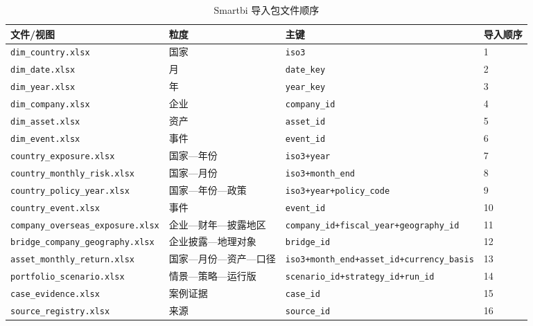 \documentclass[UTF8,fontset=windows,12pt,openany]{ctexbook}
\newcommand{\Field}[1]{{\small\nolinkurl{#1}}}
\begin{document}
\begin{longtable}{p{4.2cm}p{3.3cm}p{3.2cm}p{2.6cm}}
\caption{Smartbi 导入包文件顺序}\label{tab:import-package}\\
\toprule
\textbf{文件/视图} & \textbf{粒度} & \textbf{主键} & \textbf{导入顺序}\\
\midrule
\Field{dim_country.xlsx} & 国家 & \Field{iso3} & 1\\
\Field{dim_date.xlsx} & 月 & \Field{date_key} & 2\\
\Field{dim_year.xlsx} & 年 & \Field{year_key} & 3\\
\Field{dim_company.xlsx} & 企业 & \Field{company_id} & 4\\
\Field{dim_asset.xlsx} & 资产 & \Field{asset_id} & 5\\
\Field{dim_event.xlsx} & 事件 & \Field{event_id} & 6\\
\Field{country_exposure.xlsx} & 国家—年份 & \Field{iso3+year} & 7\\
\Field{country_monthly_risk.xlsx} & 国家—月份 & \Field{iso3+month_end} & 8\\
\Field{country_policy_year.xlsx} & 国家—年份—政策 & \Field{iso3+year+policy_code} & 9\\
\Field{country_event.xlsx} & 事件 & \Field{event_id} & 10\\
\Field{company_overseas_exposure.xlsx} & 企业—财年—披露地区 & \Field{company_id+fiscal_year+geography_id} & 11\\
\Field{bridge_company_geography.xlsx} & 企业披露—地理对象 & \Field{bridge_id} & 12\\
\Field{asset_monthly_return.xlsx} & 国家—月份—资产—口径 & \Field{iso3+month_end+asset_id+currency_basis} & 13\\
\Field{portfolio_scenario.xlsx} & 情景—策略—运行版 & \Field{scenario_id+strategy_id+run_id} & 14\\
\Field{case_evidence.xlsx} & 案例证据 & \Field{case_id} & 15\\
\Field{source_registry.xlsx} & 来源 & \Field{source_id} & 16\\
\bottomrule
\end{longtable}

\newpage
\end{document}
